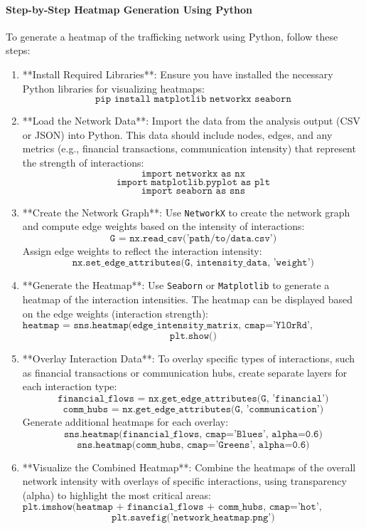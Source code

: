 \documentclass[%
 preprint, linenumbers,
 amsmath,amssymb,
 aps, physrev,
]{revtex4-2}
\begin{document}
\paragraph{Step-by-Step Heatmap Generation Using Python}

To generate a heatmap of the trafficking network using Python, follow these steps:

\begin{enumerate}
    \item **Install Required Libraries**: Ensure you have installed the necessary Python libraries for visualizing heatmaps:
    \[
    \texttt{pip install matplotlib networkx seaborn}
    \]
    
    \item **Load the Network Data**: Import the data from the analysis output (CSV or JSON) into Python. This data should include nodes, edges, and any metrics (e.g., financial transactions, communication intensity) that represent the strength of interactions:
    \[
    \texttt{import networkx as nx}
    \]
    \[
    \texttt{import matplotlib.pyplot as plt}
    \]
    \[
    \texttt{import seaborn as sns}
    \]
    
    \item **Create the Network Graph**: Use \texttt{NetworkX} to create the network graph and compute edge weights based on the intensity of interactions:
    \[
    \texttt{G = nx.read\_csv('path/to/data.csv')}
    \]
    Assign edge weights to reflect the interaction intensity:
    \[
    \texttt{nx.set\_edge\_attributes(G, intensity\_data, 'weight')}
    \]
    
    \item **Generate the Heatmap**: Use \texttt{Seaborn} or \texttt{Matplotlib} to generate a heatmap of the interaction intensities. The heatmap can be displayed based on the edge weights (interaction strength):
    \[
    \texttt{heatmap = sns.heatmap(edge\_intensity\_matrix, cmap='YlOrRd', linewidths=0.5)}
    \]
    \[
    \texttt{plt.show()}
    \]
    
    \item **Overlay Interaction Data**: To overlay specific types of interactions, such as financial transactions or communication hubs, create separate layers for each interaction type:
    \[
    \texttt{financial\_flows = nx.get\_edge\_attributes(G, 'financial')}
    \]
    \[
    \texttt{comm\_hubs = nx.get\_edge\_attributes(G, 'communication')}
    \]
    Generate additional heatmaps for each overlay:
    \[
    \texttt{sns.heatmap(financial\_flows, cmap='Blues', alpha=0.6)}
    \]
    \[
    \texttt{sns.heatmap(comm\_hubs, cmap='Greens', alpha=0.6)}
    \]
    
    \item **Visualize the Combined Heatmap**: Combine the heatmaps of the overall network intensity with overlays of specific interactions, using transparency (alpha) to highlight the most critical areas:
    \[
    \texttt{plt.imshow(heatmap + financial\_flows + comm\_hubs, cmap='hot', alpha=0.7)}
    \]
    \[
    \texttt{plt.savefig('network\_heatmap.png')}
    \]
\end{enumerate}
\end{document}
